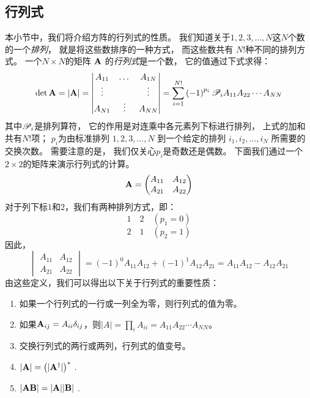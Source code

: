 \subsection{行列式}
\label{sec:1.1.3}
本小节中，我们将介绍方阵的行列式的性质。
我们知道关于$1, 2, 3, \dots, N$这$N$个数的一个\emph{排列}，
就是将这些数排序的一种方式，
而这些数共有 $N!$种不同的排列方式。
一个$N\times N$的矩阵 $\mathbf A$ 的\emph{行列式}是一个数，
它的值通过下式求得：
\begin{equation}
 \det{\mathbf A} = \vert {\mathbf A} \vert = \begin{vmatrix}
     A_{11} &\dots &A_{1N} \\ \vdots & &\vdots \\ A_{N1} &\vdots &A_{NN} 
 \end{vmatrix} = \sum_{i=1}^{N!} \left(-1\right)^{p_i}\mathscr{P}_iA_{11}A_{22}\cdots A_{NN}
 \label{eq:1.38}
\end{equation}
其中$\mathscr{P}_i$是排列算符，
它的作用是对连乘中各元素列下标进行排列，
上式的加和共有$N!$项；
$p_i$为由标准排列 $1, 2, 3, \dots, N$ 到一个给定的排列 $i_1, i_2, \dots, i_N$ 所需要的交换次数。
需要注意的是，
我们仅关心$p_i$是奇数还是偶数。
下面我们通过一个$2 \times 2$的矩阵来演示行列式的计算。
\[{\mathbf A} = \begin{pmatrix}
 A_{11} & A_{12} \\ A_{21} & A_{22}
\end{pmatrix}\]
对于列下标$1$和$2$，我们有两种排列方式，即：
\[
1 \quad 2 \quad \left(p_1 = 0\right)\]\[
2 \quad 1 \quad \left(p_2 = 1\right)\]
因此，
\begin{equation}
 \begin{vmatrix}
     A_{11} & A_{12} \\ A_{21} &A_{22}
 \end{vmatrix} = \left(-1\right)^0 A_{11}A_{12} + \left(-1\right)^1 A_{12}A_{21} = A_{11}A_{12} - A_{12}A_{21}
 \label{eq:1.39}
\end{equation}
由这些定义，我们可以得出以下关于行列式的重要性质：
\begin{enumerate}
 \item 如果一个行列式的一行或一列全为零，则行列式的值为零。
 \item 如果${\mathbf A}_{ij} = A_{ii}\delta_{ij}$，则$\vert A\vert = \prod_i A_{ii} = A_{11}A_{22}\cdots A_{NN}$。
 \item 交换行列式的两行或两列，行列式的值变号。
 \item $\vert \mathbf{A} \vert = \left(\vert\mathbf A^\dagger\vert\right)^\ast$ .
 \item $\vert {\mathbf{AB}}\vert = \vert{\mathbf A}\vert\vert\mathbf{B}\vert$ .
\end{enumerate}

